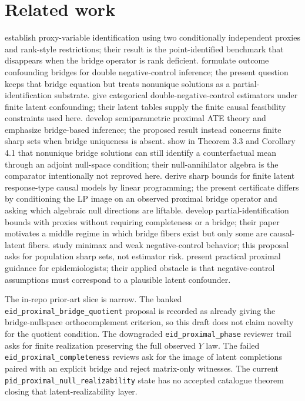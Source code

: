 \documentclass[11pt]{article}
\theoremstyle{definition}
\theoremstyle{plain}
\theoremstyle{remark}
\begin{document}
\section{Related work}
\citet{MiaoGengTchetgen2018} establish proxy-variable identification using two conditionally independent proxies and rank-style restrictions; their result is the point-identified benchmark that disappears when the bridge operator is rank deficient. \citet{MiaoShiLiTchetgen2024} formulate outcome confounding bridges for double negative-control inference; the present question keeps that bridge equation but treats nonunique solutions as a partial-identification substrate. \citet{ShiMiaoNelsonTchetgen2020} give categorical double-negative-control estimators under finite latent confounding; their latent tables supply the finite causal feasibility constraints used here. \citet{CuiPuShiMiaoTchetgen2024} develop semiparametric proximal ATE theory and emphasize bridge-based inference; the proposed result instead concerns finite sharp sets when bridge uniqueness is absent. \citet{ZhangLiMiaoTchetgen2023} show in Theorem 3.3 and Corollary 4.1 that nonunique bridge solutions can still identify a counterfactual mean through an adjoint null-space condition; their null-annihilator algebra is the comparator intentionally not reproved here. \citet{BalkePearl1997} derive sharp bounds for finite latent response-type causal models by linear programming; the present certificate differs by conditioning the LP image on an observed proximal bridge operator and asking which algebraic null directions are liftable. \citet{GhassamiShpitserTchetgen2024} develop partial-identification bounds with proxies without requiring completeness or a bridge; their paper motivates a middle regime in which bridge fibers exist but only some are causal-latent fibers. \citet{KallusMaoUehara2022} study minimax and weak negative-control behavior; this proposal asks for population sharp sets, not estimator risk. \citet{ZivichColeEdwardsMulhollandShookSaTchetgen2023} present practical proximal guidance for epidemiologists; their applied obstacle is that negative-control assumptions must correspond to a plausible latent confounder.

The in-repo prior-art slice is narrow. The banked \texttt{eid\_proximal\_bridge\_quotient} proposal is recorded as already giving the bridge-nullspace orthocomplement criterion, so this draft does not claim novelty for the quotient condition. The downgraded \texttt{eid\_proximal\_phase} reviewer trail asks for finite realization preserving the full observed \(Y\) law. The failed \texttt{eid\_proximal\_completeness} reviews ask for the image of latent completions paired with an explicit bridge and reject matrix-only witnesses. The current \texttt{pid\_proximal\_null\_realizability} state has no accepted catalogue theorem closing that latent-realizability layer.
\end{document}

